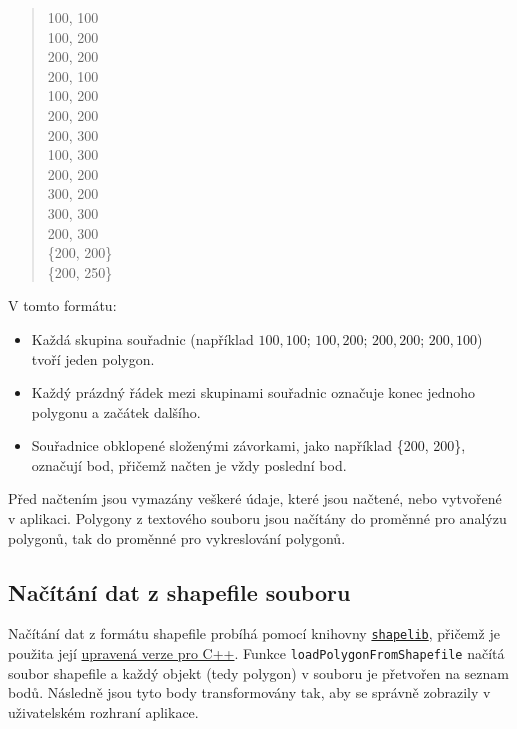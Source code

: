 \begin{quote}
100, 100 \\
100, 200 \\
200, 200 \\
200, 100 \\

100, 200 \\
200, 200 \\
200, 300 \\
100, 300 \\

200, 200 \\
300, 200 \\
300, 300 \\
200, 300 \\

\{200, 200\} \\
\{200, 250\}
\end{quote}

\noindent V tomto formátu:
\begin{itemize}
    \item Každá skupina souřadnic (například \(100,100\); \(100,200\); \(200,200\); \(200,100\)) tvoří jeden polygon.
    \item Každý prázdný řádek mezi skupinami souřadnic označuje konec jednoho polygonu a začátek dalšího.
    \item Souřadnice obklopené složenými závorkami, jako například \{200, 200\}, označují bod, přičemž načten je vždy poslední bod.
\end{itemize}
Před načtením jsou vymazány veškeré údaje, které jsou načtené, nebo vytvořené v aplikaci. Polygony z textového souboru jsou načítány do proměnné pro analýzu polygonů, tak do proměnné pro vykreslování polygonů.

\subsection{Načítání dat z shapefile souboru}
Načítání dat z formátu shapefile probíhá pomocí knihovny \texttt{\href{http://shapelib.maptools.org/}{shapelib}}, přičemž je použita její \href{https://github.com/zhihao-liu/shapefile-viewer-qt/tree/master/shapelib}{upravená verze pro C++}. Funkce \texttt{loadPolygonFromShapefile} načítá soubor shapefile a každý objekt (tedy polygon) v souboru je přetvořen na seznam bodů. Následně jsou tyto body transformovány tak, aby se správně zobrazily v uživatelském rozhraní aplikace.

